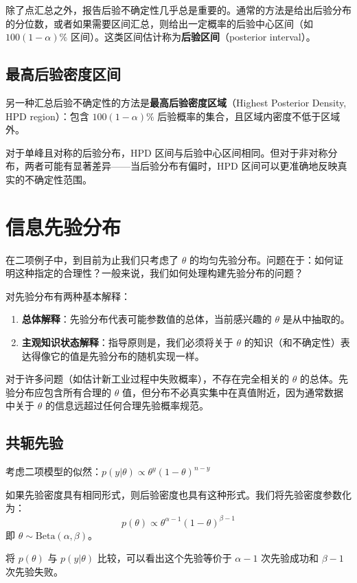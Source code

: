 除了点汇总之外，报告后验不确定性几乎总是重要的。通常的方法是给出后验分布的分位数，或者如果需要区间汇总，则给出一定概率的后验中心区间（如 $100(1-\alpha)\%$ 区间）。这类区间估计称为\textbf{后验区间}（posterior interval）。

\subsection{最高后验密度区间}

另一种汇总后验不确定性的方法是\textbf{最高后验密度区域}（Highest Posterior Density, HPD region）：包含 $100(1-\alpha)\%$ 后验概率的集合，且区域内密度不低于区域外。

对于单峰且对称的后验分布，HPD 区间与后验中心区间相同。但对于非对称分布，两者可能有显著差异——当后验分布有偏时，HPD 区间可以更准确地反映真实的不确定性范围。

\section{信息先验分布}

在二项例子中，到目前为止我们只考虑了 $\theta$ 的均匀先验分布。问题在于：如何证明这种指定的合理性？一般来说，我们如何处理构建先验分布的问题？

对先验分布有两种基本解释：
\begin{enumerate}
  \item \textbf{总体解释}：先验分布代表可能参数值的总体，当前感兴趣的 $\theta$ 是从中抽取的。
  \item \textbf{主观知识状态解释}：指导原则是，我们必须将关于 $\theta$ 的知识（和不确定性）表达得像它的值是先验分布的随机实现一样。
\end{enumerate}

对于许多问题（如估计新工业过程中失败概率），不存在完全相关的 $\theta$ 的总体。先验分布应包含所有合理的 $\theta$ 值，但分布不必真实集中在真值附近，因为通常数据中关于 $\theta$ 的信息远超过任何合理先验概率规范。

\subsection{共轭先验}

考虑二项模型的似然：$p(y|\theta) \propto \theta^y (1-\theta)^{n-y}$

如果先验密度具有相同形式，则后验密度也具有这种形式。我们将先验密度参数化为：
\[
p(\theta) \propto \theta^{\alpha-1}(1-\theta)^{\beta-1}
\]
即 $\theta \sim \text{Beta}(\alpha, \beta)$。

将 $p(\theta)$ 与 $p(y|\theta)$ 比较，可以看出这个先验等价于 $\alpha-1$ 次先验成功和 $\beta-1$ 次先验失败。

